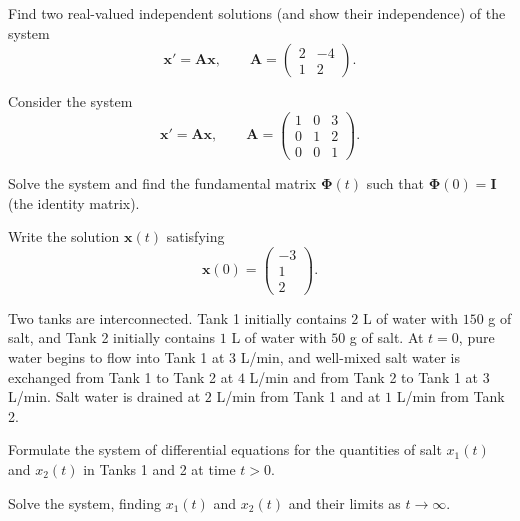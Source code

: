 \documentclass[11pt,oneside]{article}
\begin{document}
\begin{problem}
Find two real-valued independent solutions (and show their independence) of the system
\[
\mathbf x'=\mathbf A\mathbf x,\qquad
\mathbf A=\begin{pmatrix}2&-4\\1&2\end{pmatrix}.
\]
\end{problem}

\begin{problem}
Consider the system
\[
\mathbf x'=\mathbf A\mathbf x,\qquad
\mathbf A=\begin{pmatrix}1&0&3\\0&1&2\\0&0&1\end{pmatrix}.
\]
\begin{problemsubparts}
\item Solve the system and find the fundamental matrix $\boldsymbol\Phi(t)$ such that $\boldsymbol\Phi(0)=\mathbf I$ (the identity matrix).
\item Write the solution $\mathbf x(t)$ satisfying
\[
\mathbf x(0)=\begin{pmatrix}-3\\1\\2\end{pmatrix}.
\]
\end{problemsubparts}
\end{problem}

\begin{problem}
Two tanks are interconnected. Tank 1 initially contains $2$ L of water with $150$ g of salt, and Tank 2 initially contains $1$ L of water with $50$ g of salt. At $t=0$, pure water begins to flow into Tank 1 at $3$ L/min, and well-mixed salt water is exchanged from Tank 1 to Tank 2 at $4$ L/min and from Tank 2 to Tank 1 at $3$ L/min. Salt water is drained at $2$ L/min from Tank 1 and at $1$ L/min from Tank 2.
\begin{problemsubparts}
\item Formulate the system of differential equations for the quantities of salt $x_1(t)$ and $x_2(t)$ in Tanks 1 and 2 at time $t>0$.
\item Solve the system, finding $x_1(t)$ and $x_2(t)$ and their limits as $t\to\infty$.
\end{problemsubparts}
\end{problem}
\end{document}
